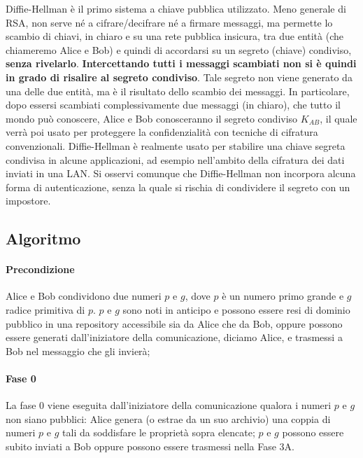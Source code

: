 Diffie-Hellman è il primo sistema a chiave pubblica utilizzato. Meno generale di RSA, non serve né a cifrare/decifrare né a firmare messaggi, ma permette lo scambio di chiavi, in chiaro e su una rete pubblica insicura, tra due entità (che chiameremo Alice e Bob) e quindi di accordarsi su un segreto (chiave) condiviso, \textbf{senza rivelarlo}. \textbf{Intercettando tutti i messaggi scambiati non si è quindi in grado di risalire al segreto condiviso}. Tale segreto non viene generato da una delle due entità, ma è il risultato dello scambio dei messaggi. In particolare, dopo essersi scambiati complessivamente due messaggi (in chiaro), che tutto il mondo può conoscere, Alice e Bob conosceranno il segreto condiviso $K_{AB}$, il quale verrà poi usato per proteggere la confidenzialità con tecniche di cifratura convenzionali.
\newline \newline
Diffie-Hellman è realmente usato per stabilire una chiave segreta condivisa in alcune applicazioni, ad esempio nell'ambito della cifratura dei dati inviati in una LAN. Si osservi comunque che Diffie-Hellman non incorpora alcuna forma di autenticazione, senza la quale si rischia di condividere il segreto con un impostore.  

\subsection{Algoritmo} 
\paragraph{Precondizione}
Alice e Bob condividono due numeri $p$ e $g$, dove $p$ è un numero primo grande e $g$ radice primitiva di $p$. $p$ e $g$ sono noti in anticipo e possono essere resi di dominio pubblico in una repository accessibile sia da Alice che da Bob, oppure possono essere generati dall'iniziatore della comunicazione, diciamo Alice, e trasmessi a Bob nel messaggio che gli invierà;
\paragraph{Fase 0}
La fase 0 viene eseguita dall'iniziatore della comunicazione qualora i numeri $p$ e $g$ non siano pubblici: Alice genera (o estrae da un suo archivio) una coppia di numeri $p$ e $g$ tali da soddisfare le proprietà sopra elencate; $p$ e $g$ possono essere subito inviati a Bob oppure possono essere trasmessi nella Fase 3A.
